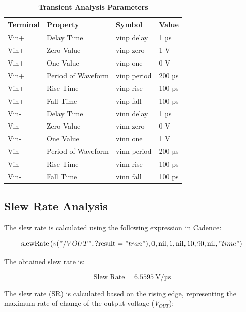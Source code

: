 \begin{table}[h]
    \centering
    \captionsetup{justification=centering} %
    \caption*{\textbf{Transient Analysis Parameters}} %
    \begin{tabular}{l l l l}
        \toprule
        Terminal & Property & Symbol & Value \\
        \midrule
        Vin+ & Delay Time & vinp delay & 1 µs \\
        Vin+ & Zero Value & vinp zero & 1 V \\
        Vin+ & One Value & vinp one & 0 V \\
        Vin+ & Period of Waveform & vinp period & 200 µs \\
        Vin+ & Rise Time & vinp rise & 100 ps \\
        Vin+ & Fall Time & vinp fall & 100 ps \\
        Vin- & Delay Time & vinn delay & 1 µs \\
        Vin- & Zero Value & vinn zero & 0 V \\
        Vin- & One Value & vinn one & 1 V \\
        Vin- & Period of Waveform & vinn period & 200 µs \\
        Vin- & Rise Time & vinn rise & 100 ps \\
        Vin- & Fall Time & vinn fall & 100 ps \\
        \bottomrule
    \end{tabular}
    \label{tab:transient_analysis}
\end{table}



\subsection{Slew Rate Analysis}
The slew rate is calculated using the following expression in Cadence:


\begin{equation}
\text{slewRate} \left( v("/VOUT", \text{?result} = "tran"), 0, \text{nil}, 1, \text{nil}, 10, 90, \text{nil}, "time" \right)
\end{equation}

The obtained slew rate is:

\begin{equation}
\text{Slew Rate} = 6.5595\, \text{V/µs}
\end{equation}

The slew rate (SR) is calculated based on the rising edge, representing the maximum rate of change of the output voltage ($V_{OUT}$):


